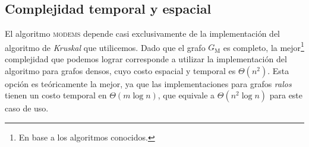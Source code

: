 \subsection{Complejidad temporal y espacial} El algoritmo \textsc{modems} depende casi exclusivamente de la implementación del algoritmo de \textit{Kruskal} que utilicemos. Dado que el grafo $G_\text{M}$ es completo, la mejor\footnote{ En base a los algoritmos conocidos.} complejidad que podemos lograr corresponde a utilizar la implementación del algoritmo para grafos densos, cuyo costo espacial y temporal es $\Theta(n^2)$. Esta opción es teóricamente la mejor, ya que las implementaciones para grafos \textit{ralos} tienen un costo temporal en $\Theta(m\log n)$, que equivale a $\Theta(n^2 \log n)$ para este caso de uso.
